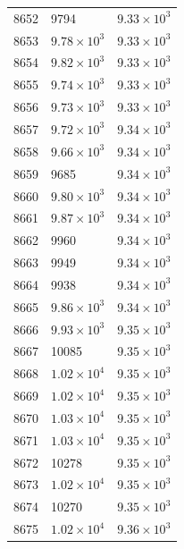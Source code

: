 \begin{table}[H]
\begin{tabular}{lll}
8652 & 9794 & $\displaystyle 9.33 \times 10^{3}$ \\
8653 & $\displaystyle 9.78 \times 10^{3}$ & $\displaystyle 9.33 \times 10^{3}$ \\
8654 & $\displaystyle 9.82 \times 10^{3}$ & $\displaystyle 9.33 \times 10^{3}$ \\
8655 & $\displaystyle 9.74 \times 10^{3}$ & $\displaystyle 9.33 \times 10^{3}$ \\
8656 & $\displaystyle 9.73 \times 10^{3}$ & $\displaystyle 9.33 \times 10^{3}$ \\
8657 & $\displaystyle 9.72 \times 10^{3}$ & $\displaystyle 9.34 \times 10^{3}$ \\
8658 & $\displaystyle 9.66 \times 10^{3}$ & $\displaystyle 9.34 \times 10^{3}$ \\
8659 & 9685 & $\displaystyle 9.34 \times 10^{3}$ \\
8660 & $\displaystyle 9.80 \times 10^{3}$ & $\displaystyle 9.34 \times 10^{3}$ \\
8661 & $\displaystyle 9.87 \times 10^{3}$ & $\displaystyle 9.34 \times 10^{3}$ \\
8662 & 9960 & $\displaystyle 9.34 \times 10^{3}$ \\
8663 & 9949 & $\displaystyle 9.34 \times 10^{3}$ \\
8664 & 9938 & $\displaystyle 9.34 \times 10^{3}$ \\
8665 & $\displaystyle 9.86 \times 10^{3}$ & $\displaystyle 9.34 \times 10^{3}$ \\
8666 & $\displaystyle 9.93 \times 10^{3}$ & $\displaystyle 9.35 \times 10^{3}$ \\
8667 & 10085 & $\displaystyle 9.35 \times 10^{3}$ \\
8668 & $\displaystyle 1.02 \times 10^{4}$ & $\displaystyle 9.35 \times 10^{3}$ \\
8669 & $\displaystyle 1.02 \times 10^{4}$ & $\displaystyle 9.35 \times 10^{3}$ \\
8670 & $\displaystyle 1.03 \times 10^{4}$ & $\displaystyle 9.35 \times 10^{3}$ \\
8671 & $\displaystyle 1.03 \times 10^{4}$ & $\displaystyle 9.35 \times 10^{3}$ \\
8672 & 10278 & $\displaystyle 9.35 \times 10^{3}$ \\
8673 & $\displaystyle 1.02 \times 10^{4}$ & $\displaystyle 9.35 \times 10^{3}$ \\
8674 & 10270 & $\displaystyle 9.35 \times 10^{3}$ \\
8675 & $\displaystyle 1.02 \times 10^{4}$ & $\displaystyle 9.36 \times 10^{3}$ \\

\end{tabular}
\end{table}
